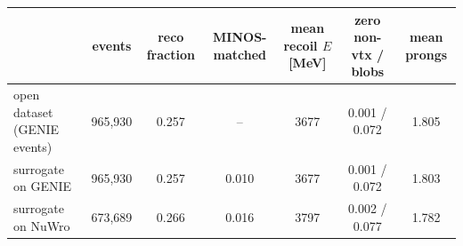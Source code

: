 \begin{tabular}{lcccccc}
\toprule
 & events & reco fraction & MINOS-matched & mean recoil $E$ [MeV] & zero non-vtx / blobs & mean prongs \\
\midrule
open dataset (GENIE events) & 965,930 & 0.257 & -- & 3677 & 0.001 / 0.072 & 1.805 \\
surrogate on GENIE & 965,930 & 0.257 & 0.010 & 3677 & 0.001 / 0.072 & 1.803 \\
surrogate on NuWro & 673,689 & 0.266 & 0.016 & 3797 & 0.002 / 0.077 & 1.782 \\
\bottomrule
\end{tabular}
